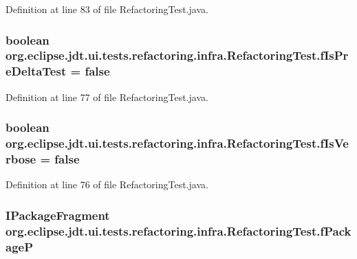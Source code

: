 Definition at line 83 of file RefactoringTest.java.

\hypertarget{classorg_1_1eclipse_1_1jdt_1_1ui_1_1tests_1_1refactoring_1_1infra_1_1RefactoringTest_aac1c4a306842560f3f461f9a3bb05ba2}{
\subsubsection[{fIsPreDeltaTest}]{\setlength{\rightskip}{0pt plus 5cm}boolean {\bf org.eclipse.jdt.ui.tests.refactoring.infra.RefactoringTest.fIsPreDeltaTest} = false}}
\label{classorg_1_1eclipse_1_1jdt_1_1ui_1_1tests_1_1refactoring_1_1infra_1_1RefactoringTest_aac1c4a306842560f3f461f9a3bb05ba2}


Definition at line 77 of file RefactoringTest.java.

\hypertarget{classorg_1_1eclipse_1_1jdt_1_1ui_1_1tests_1_1refactoring_1_1infra_1_1RefactoringTest_a5a5685ebaef1a05eaad29c505dbb2a63}{
\subsubsection[{fIsVerbose}]{\setlength{\rightskip}{0pt plus 5cm}boolean {\bf org.eclipse.jdt.ui.tests.refactoring.infra.RefactoringTest.fIsVerbose} = false}}
\label{classorg_1_1eclipse_1_1jdt_1_1ui_1_1tests_1_1refactoring_1_1infra_1_1RefactoringTest_a5a5685ebaef1a05eaad29c505dbb2a63}


Definition at line 76 of file RefactoringTest.java.

\hypertarget{classorg_1_1eclipse_1_1jdt_1_1ui_1_1tests_1_1refactoring_1_1infra_1_1RefactoringTest_a166a31ebb383a0c7e2efd64fdc0d7bf1}{
\subsubsection[{fPackageP}]{\setlength{\rightskip}{0pt plus 5cm}IPackageFragment {\bf org.eclipse.jdt.ui.tests.refactoring.infra.RefactoringTest.fPackageP}}}
\label{classorg_1_1eclipse_1_1jdt_1_1ui_1_1tests_1_1refactoring_1_1infra_1_1RefactoringTest_a166a31ebb383a0c7e2efd64fdc0d7bf1}


